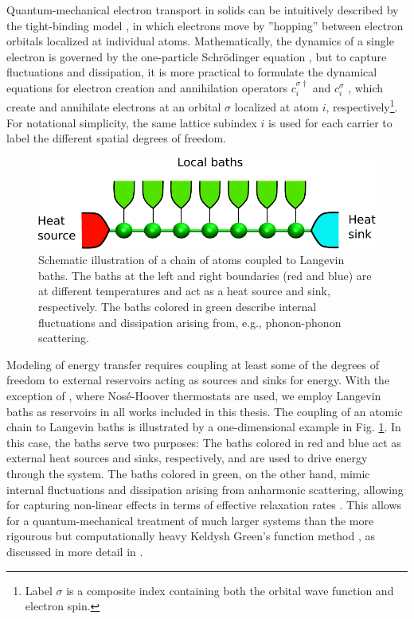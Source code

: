 Quantum-mechanical electron transport in solids can be intuitively described by the tight-binding model \cite{ashcroftmermin}, in which electrons move by ''hopping'' between electron orbitals localized at individual atoms. Mathematically, the dynamics of a single electron is governed by the one-particle Schr\"odinger equation \cite{griffiths_qm}, but to capture fluctuations and dissipation, it is more practical to formulate the dynamical equations for electron creation and annihilation operators $c_i^{\sigma\dagger}$ and $c_i^{\sigma}$ \cite{ballentine}, which create and annihilate electrons at an orbital $\sigma$ localized at atom $i$, respectively\footnote{Label $\sigma$ is a composite index containing both the orbital wave function and electron spin.}. For notational simplicity, the same lattice subindex $i$ is used for each carrier to label the different spatial degrees of freedom. 
\begin{figure}
 \begin{center}
 \includegraphics[width=.99\columnwidth]{pics/chain_baths.pdf}
 \caption{Schematic illustration of a chain of atoms coupled to Langevin baths. The baths at the left and right boundaries (red and blue) are at different temperatures and act as a heat source and sink, respectively. The baths colored in green describe internal fluctuations and dissipation arising from, e.g., phonon-phonon scattering.}
 \label{fig:langevin_chain}
  \end{center}
\end{figure}

Modeling of energy transfer requires coupling at least some of the degrees of freedom to external reservoirs acting as sources and sinks for energy. With the exception of , where Nos\'e-Hoover thermostats \cite{nose84} are used, we employ Langevin baths as reservoirs in all works included in this thesis. The coupling of an atomic chain to Langevin baths is illustrated by a one-dimensional example in Fig. \ref{fig:langevin_chain}. In this case, the baths serve two purposes: The baths colored in red and blue act as external heat sources and sinks, respectively, and are used to drive energy through the system. The baths colored in green, on the other hand, mimic internal fluctuations and dissipation arising from anharmonic scattering, allowing for capturing non-linear effects in terms of effective relaxation rates \cite{bolsterli70}. This allows for a quantum-mechanical treatment of much larger systems than the more rigourous but computationally heavy Keldysh Green's function method \cite{haugjauho}, as discussed in more detail in . %

